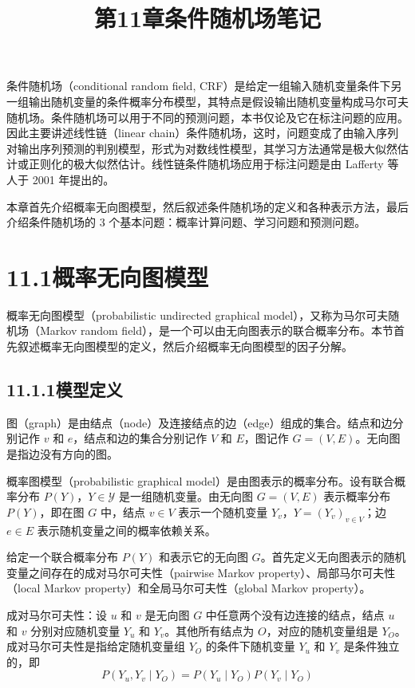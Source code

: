 \documentclass[UTF8,12pt,a4paper,fontset=fandol]{ctexart}
\title{第11章\quad 条件随机场笔记}
\author{}
\date{}
\begin{document}
\maketitle

条件随机场（conditional random field, CRF）是给定一组输入随机变量条件下另一组输出随机变量的条件概率分布模型，其特点是假设输出随机变量构成马尔可夫随机场。条件随机场可以用于不同的预测问题，本书仅论及它在标注问题的应用。因此主要讲述线性链（linear chain）条件随机场，这时，问题变成了由输入序列对输出序列预测的判别模型，形式为对数线性模型，其学习方法通常是极大似然估计或正则化的极大似然估计。线性链条件随机场应用于标注问题是由 Lafferty 等人于 2001 年提出的。

本章首先介绍概率无向图模型，然后叙述条件随机场的定义和各种表示方法，最后介绍条件随机场的 3 个基本问题：概率计算问题、学习问题和预测问题。

\section*{11.1\quad 概率无向图模型}

概率无向图模型（probabilistic undirected graphical model），又称为马尔可夫随机场（Markov random field），是一个可以由无向图表示的联合概率分布。本节首先叙述概率无向图模型的定义，然后介绍概率无向图模型的因子分解。

\subsection*{11.1.1\quad 模型定义}

图（graph）是由结点（node）及连接结点的边（edge）组成的集合。结点和边分别记作 $v$ 和 $e$，结点和边的集合分别记作 $V$ 和 $E$，图记作 $G=(V,E)$。无向图是指边没有方向的图。

概率图模型（probabilistic graphical model）是由图表示的概率分布。设有联合概率分布 $P(Y)$，$Y\in\mathcal{Y}$ 是一组随机变量。由无向图 $G=(V,E)$ 表示概率分布 $P(Y)$，即在图 $G$ 中，结点 $v\in V$ 表示一个随机变量 $Y_v$，$Y=(Y_v)_{v\in V}$；边 $e\in E$ 表示随机变量之间的概率依赖关系。

给定一个联合概率分布 $P(Y)$ 和表示它的无向图 $G$。首先定义无向图表示的随机变量之间存在的成对马尔可夫性（pairwise Markov property）、局部马尔可夫性（local Markov property）和全局马尔可夫性（global Markov property）。

成对马尔可夫性：设 $u$ 和 $v$ 是无向图 $G$ 中任意两个没有边连接的结点，结点 $u$ 和 $v$ 分别对应随机变量 $Y_u$ 和 $Y_v$。其他所有结点为 $O$，对应的随机变量组是 $Y_O$。成对马尔可夫性是指给定随机变量组 $Y_O$ 的条件下随机变量 $Y_u$ 和 $Y_v$ 是条件独立的，即
\begin{equation}
P(Y_u,Y_v\mid Y_O)=P(Y_u\mid Y_O)P(Y_v\mid Y_O)
\tag{11.1}
\end{equation}
\end{document}
